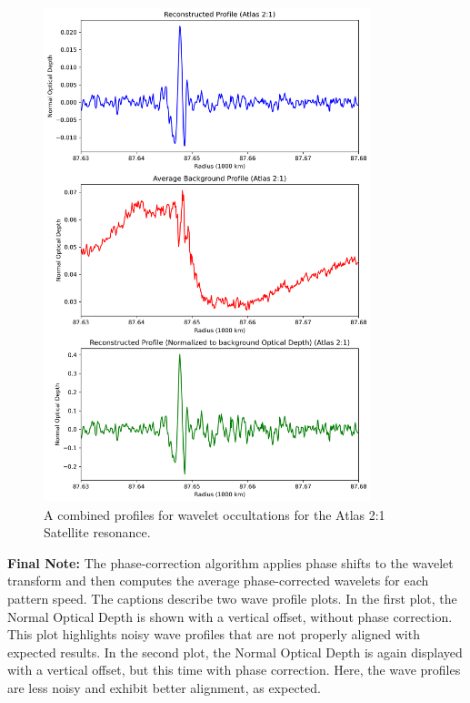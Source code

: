 \documentclass{article}
\begin{document}
\begin{figure}
\centering 
\includegraphics[width=0.85\textwidth]{combinedprofiles_atlas21.png}
\caption{A combined profiles for wavelet occultations for the Atlas 2:1 Satellite resonance.} \label{fig:my_label}
\end{figure}



\textbf{Final Note:}
The phase-correction algorithm applies phase shifts to the wavelet transform and then computes the average phase-corrected wavelets for each pattern speed. The captions describe two wave profile plots. In the first plot, the Normal Optical Depth is shown with a vertical offset, without phase correction. This plot highlights noisy wave profiles that are not properly aligned with expected results. In the second plot, the Normal Optical Depth is again displayed with a vertical offset, but this time with phase correction. Here, the wave profiles are less noisy and exhibit better alignment, as expected.
\end{document}
